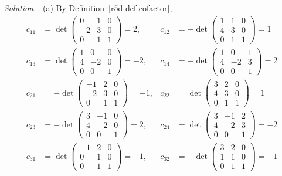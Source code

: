 \documentclass[12pt]{article}
\theoremstyle{definition}
\newenvironment{solution}{\par\noindent\textit{Solution.}\ }{\par\smallskip}
\begin{document}
\begin{solution}
(a) By Definition~\ref{r5d-def-cofactor},
\[
\begin{aligned}
c_{11}&=\det\left(\begin{smallmatrix}0&1&0\\-2&3&0\\0&1&1\end{smallmatrix}\right)=2,&
c_{12}&=-\det\left(\begin{smallmatrix}1&1&0\\4&3&0\\0&1&1\end{smallmatrix}\right)=1\\
c_{13}&=\det\left(\begin{smallmatrix}1&0&0\\4&-2&0\\0&0&1\end{smallmatrix}\right)=-2,&
c_{14}&=-\det\left(\begin{smallmatrix}1&0&1\\4&-2&3\\0&0&1\end{smallmatrix}\right)=2\\
c_{21}&=-\det\left(\begin{smallmatrix}-1&2&0\\-2&3&0\\0&1&1\end{smallmatrix}\right)=-1,&
c_{22}&=\det\left(\begin{smallmatrix}3&2&0\\4&3&0\\0&1&1\end{smallmatrix}\right)=1\\
c_{23}&=-\det\left(\begin{smallmatrix}3&-1&0\\4&-2&0\\0&0&1\end{smallmatrix}\right)=2,&
c_{24}&=\det\left(\begin{smallmatrix}3&-1&2\\4&-2&3\\0&0&1\end{smallmatrix}\right)=-2\\
c_{31}&=\det\left(\begin{smallmatrix}-1&2&0\\0&1&0\\0&1&1\end{smallmatrix}\right)=-1,&
c_{32}&=-\det\left(\begin{smallmatrix}3&2&0\\1&1&0\\0&1&1\end{smallmatrix}\right)=-1\\

\end{aligned}\]
\end{solution}
\end{document}
